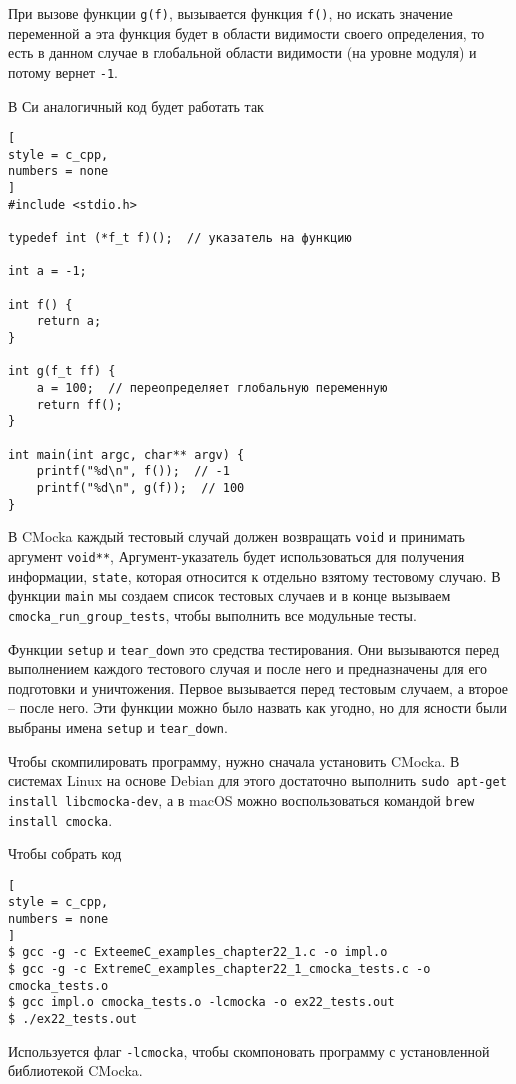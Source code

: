\documentclass[%
	11pt,
	a4paper,
	utf8,
		]{article}
\begin{document}
При вызове функции \verb|g(f)|, вызывается функция \verb|f()|, но искать значение переменной \verb|a| эта функция будет в области видимости своего определения, то есть в данном случае в глобальной области видимости (на уровне модуля) и потому вернет \verb|-1|.

В Си аналогичный код будет работать так
\begin{lstlisting}[
style = c_cpp,
numbers = none
]
#include <stdio.h>

typedef int (*f_t f)();  // указатель на функцию

int a = -1;

int f() {
    return a;
}

int g(f_t ff) {
    a = 100;  // переопределяет глобальную переменную
    return ff();
}

int main(int argc, char** argv) {
    printf("%d\n", f());  // -1
    printf("%d\n", g(f));  // 100
}
\end{lstlisting}

В CMocka каждый тестовый случай должен возвращать \verb|void| и принимать аргумент \verb|void**|, Аргумент-указатель будет использоваться для получения информации, \verb|state|, которая относится к отдельно взятому тестовому случаю. В функции \verb|main| мы создаем список тестовых случаев и в конце вызываем \verb|cmocka_run_group_tests|, чтобы выполнить все модульные тесты.

Функции \verb|setup| и \verb|tear_down| это средства тестирования. Они вызываются перед выполнением каждого тестового случая и после него и предназначены для его подготовки и уничтожения. Первое вызывается перед тестовым случаем, а второе -- после него. Эти функции можно было назвать как угодно, но для ясности были выбраны имена \verb|setup| и \verb|tear_down|.

Чтобы скомпилировать программу, нужно сначала установить CMocka. В системах Linux на основе Debian для этого достаточно выполнить \verb|sudo apt-get install libcmocka-dev|, а в macOS можно воспользоваться командой \verb|brew install cmocka|.

Чтобы собрать код
\begin{lstlisting}[
style = c_cpp,
numbers = none
]
$ gcc -g -c ExteemeC_examples_chapter22_1.c -o impl.o
$ gcc -g -c ExtremeC_examples_chapter22_1_cmocka_tests.c -o cmocka_tests.o
$ gcc impl.o cmocka_tests.o -lcmocka -o ex22_tests.out
$ ./ex22_tests.out
\end{lstlisting}

Используется флаг \verb|-lcmocka|, чтобы скомпоновать программу с установленной библиотекой CMocka.
\end{document}
